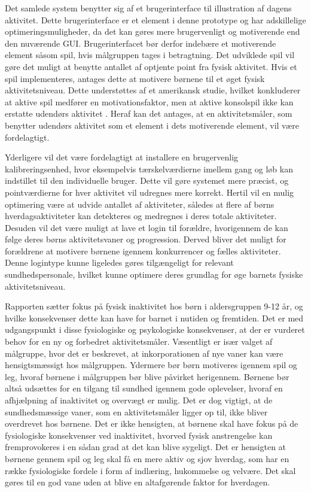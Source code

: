 Det samlede system benytter sig af et brugerinterface til illustration af dagens aktivitet. Dette brugerinterface er et element i denne prototype og har adskillelige optimeringsmuligheder, da det kan gøres mere brugervenligt og motiverende end den nuværende GUI. Brugerinterfacet bør derfor indebære et motiverende element såsom spil, hvis målgruppen tages i betragtning. Det udviklede spil vil gøre det muligt at benytte antallet af optjente point fra fysisk aktivitet. Hvis et spil implementeres, antages dette at motivere børnene til et øget fysisk aktivitetsniveau. Dette understøttes af et amerikansk studie, hvilket konkluderer at aktive spil medfører en motivationsfaktor, men at aktive konsolspil ikke kan erstatte udendørs aktivitet \citep{Oestergaard2012}. Heraf kan det antages, at en aktivitetsmåler, som benytter udendørs aktivitet som et element i dets motiverende element, vil være fordelagtigt.

Yderligere vil det være fordelagtigt at installere en brugervenlig kalibreringsenhed, hvor eksempelvis tærskelværdierne imellem gang og løb kan indstillet til den individuelle bruger. Dette vil gøre systemet mere præcist, og pointværdierne for hver aktivitet vil udregnes mere korrekt. Hertil vil en mulig optimering være at udvide antallet af aktiviteter, således at flere af børns hverdagsaktiviteter kan detekteres og medregnes i deres totale aktiviteter. Desuden vil det være muligt at lave et login til forældre, hvorigennem de kan følge deres børns aktivitetsvaner og progression. Derved bliver det muligt for forældrene at motivere børnene igennem konkurrencer og fælles aktiviteter. Denne logintype kunne ligeledes gøres tilgængeligt for relevant sundhedspersonale, hvilket kunne optimere deres grundlag for øge barnets fysiske aktivitetsniveau.

Rapporten sætter fokus på fysisk inaktivitet hos børn i aldersgruppen 9-12 år, og hvilke konsekvenser dette kan have for barnet i nutiden og fremtiden. Det er med udgangspunkt i disse fysiologiske og psykologiske konsekvenser, at der er vurderet behov for en ny og forbedret aktivitetsmåler. Væsentligt er især valget af målgruppe, hvor det er beskrevet, at inkorporationen af nye vaner kan være hensigtsmæssigt hos målgruppen. Ydermere bør børn motiveres igennem spil og leg, hvoraf børnene i målgruppen bør blive påvirket herigennem. Børnene bør altså udsættes for en tilgang til sundhed igennem gode oplevelser, hvoraf en afhjælpning af inaktivitet og overvægt er mulig. Det er dog vigtigt, at de sundhedsmæssige vaner, som en aktivitetsmåler ligger op til, ikke bliver overdrevet hos børnene. Det er ikke hensigten, at børnene skal have fokus på de fysiologiske konsekvenser ved inaktivitet, hvorved fysisk anstrengelse kan fremprovokeres i en sådan grad at det kan blive sygeligt. Det er hensigten at børnene gennem spil og leg skal få en mere aktiv og sjov hverdag, som har en række fysiologiske fordele i form af indlæring, hukommelse og velvære. Det skal gøres til en god vane uden at blive en altafgørende faktor for hverdagen.